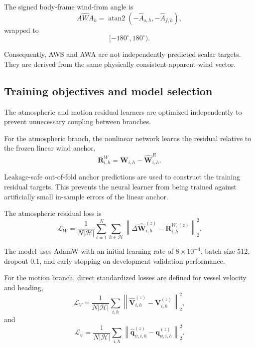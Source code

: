 The signed body-frame wind-from angle is
\begin{equation}
\widehat{AWA}_h
=
\operatorname{atan2}
\left(
-\hat A_{s,h},
-\hat A_{f,h}
\right),
\label{eq:awa}
\end{equation}
wrapped to
\begin{equation}
[-180^\circ,180^\circ).
\end{equation}

Consequently, AWS and AWA are not independently predicted scalar targets. They are derived from the same physically consistent apparent-wind vector.

\subsection{Training objectives and model selection}
\label{subsec:training_objectives}

The atmospheric and motion residual learners are optimized independently to prevent unnecessary coupling between branches.

For the atmospheric branch, the nonlinear network learns the residual relative to the frozen linear wind anchor,
\begin{equation}
\mathbf R^W_{i,h}
=
\mathbf W_{i,h}
-
\hat{\mathbf W}_{i,h}^{R}.
\label{eq:wind_residual_target}
\end{equation}

Leakage-safe out-of-fold anchor predictions are used to construct the training residual targets. This prevents the neural learner from being trained against artificially small in-sample errors of the linear anchor.

The atmospheric residual loss is
\begin{equation}
\mathcal L_W
=
\frac{1}{
N
\left|
\mathcal H
\right|
}
\sum_{i=1}^{N}
\sum_{h\in\mathcal H}
\left\|
\Delta\hat{\mathbf W}^{(z)}_{i,h}
-
\mathbf R^{W,(z)}_{i,h}
\right\|_2^2.
\label{eq:wind_loss}
\end{equation}

The model uses AdamW with an initial learning rate of $8\times10^{-4}$, batch size 512, dropout 0.1, and early stopping on development validation performance.

For the motion branch, direct standardized losses are defined for vessel velocity and heading,
\begin{equation}
\mathcal L_V
=
\frac{1}{
N
\left|
\mathcal H
\right|
}
\sum_{i,h}
\left\|
\hat{\mathbf V}^{(z)}_{i,h}
-
\mathbf V^{(z)}_{i,h}
\right\|_2^2,
\label{eq:vessel_loss}
\end{equation}
and
\begin{equation}
\mathcal L_\psi
=
\frac{1}{
N
\left|
\mathcal H
\right|
}
\sum_{i,h}
\left\|
\hat{\mathbf q}^{(z)}_{\psi,i,h}
-
\mathbf q^{(z)}_{\psi,i,h}
\right\|_2^2.
\label{eq:heading_loss}
\end{equation}

